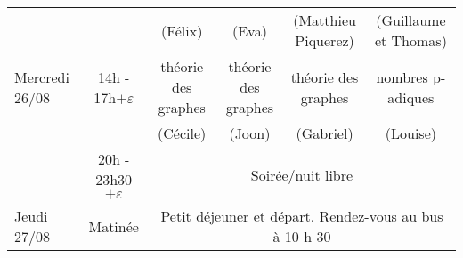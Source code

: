 \begin{center}
{\begin{tabular}{|l|c|c|c|c|c|}
& &  (Félix) &  (Eva) & (Matthieu Piquerez)  & (Guillaume et Thomas)\\
\cline{2-6}
\small{Mercredi 26/08} & 14h - 17h$+ \varepsilon$ & théorie des graphes & théorie des graphes & théorie des graphes & nombres p-adiques \\
& &  (Cécile) &  (Joon) & (Gabriel)  & (Louise)\\
\cline{2-6}
& 20h - 23h30 $+ \varepsilon$ & \multicolumn{4}{c|}{Soirée/nuit libre} \\\hline
Jeudi 27/08 & Matinée & \multicolumn{4}{c|}{Petit déjeuner et départ. Rendez-vous au bus à 10 h 30} \\
\hline
\end{tabular}}
\end{center}
\vspace{\fill}


